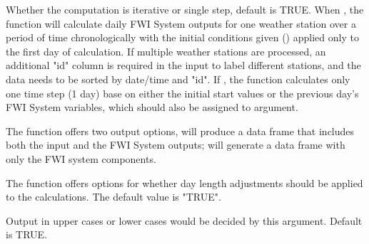 \documentclass[a4paper]{book}
\begin{document}
\begin{Arguments}
\begin{ldescription}
\item[\code{batch}] Whether the computation is iterative or single step, default is
TRUE. When , the function will calculate daily FWI System
outputs for one weather station over a period of time chronologically with
the initial conditions given () applied only to the first day of
calculation. If multiple weather stations are processed, an additional "id"
column is required in the input to label different stations, and the data
needs to be sorted by date/time and "id".  If , the
function calculates only one time step (1 day) base on either the initial
start values or the previous day's FWI System variables, which should also
be assigned to  argument.

\item[\code{out}] The function offers two output options,  will
produce a data frame that includes both the input and the FWI System
outputs;  will generate a data frame with only the FWI
system components.

\item[\code{lat.adjust}] The function offers options for whether day length
adjustments should be applied to the calculations.  The default value is
"TRUE".

\item[\code{uppercase}] Output in upper cases or lower cases would be decided by
this argument. Default is TRUE.
\end{ldescription}
\end{Arguments}
%
\end{document}
